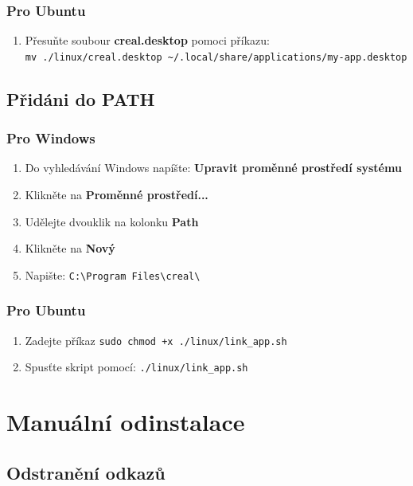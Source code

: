 \documentclass[12pt]{article}
\begin{document}
\subsubsection{Pro Ubuntu}

\begin{enumerate}
    \item Přesuňte soubour \textbf{creal.desktop} pomoci příkazu:\\
    \verb|mv ./linux/creal.desktop ~/.local/share/applications/my-app.desktop|
\end{enumerate}

\subsection{Přidáni do PATH}

\subsubsection{Pro Windows}

\begin{enumerate}
    \item Do vyhledávání Windows napíšte: \textbf{Upravit proměnné prostředí systému}
    \item Klikněte na \textbf{Proměnné prostředí...}
    \item Udělejte dvouklik na kolonku \textbf{Path}
    \item Klikněte na \textbf{Nový}
    \item Napište: \verb|C:\Program Files\creal\|
\end{enumerate}

\subsubsection{Pro Ubuntu}

\begin{enumerate}
    \item Zadejte příkaz \verb|sudo chmod +x ./linux/link_app.sh|
    \item Spusťte skript pomocí: \verb|./linux/link_app.sh|    
\end{enumerate}

\newpage

\section{Manuální odinstalace}

\subsection{Odstranění odkazů}
\end{document}
